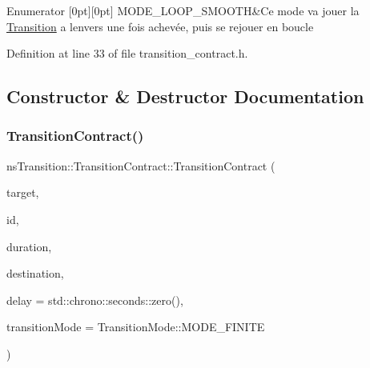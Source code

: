 \begin{DoxyEnumFields}{Enumerator}
[0pt][0pt]{}\mbox{\label{classns_transition_1_1_transition_contract_a40118ebf3c1a0a486934ce2b9ddc3edba5aa6e1fbf9670aa9ecd96beff2ba6abb}} 
M\+O\+D\+E\+\_\+\+L\+O\+O\+P\+\_\+\+S\+M\+O\+O\+TH&Ce mode va jouer la \hyperlink{classns_transition_1_1_transition}{Transition} a l\textquotesingle{}envers une fois achevée, puis se rejouer en boucle \\
\hline

\end{DoxyEnumFields}


Definition at line 33 of file transition\+\_\+contract.\+h.



\subsection{Constructor \& Destructor Documentation}
\mbox{\label{classns_transition_1_1_transition_contract_a8ec4ef83c08901c9b93cec5eb0bfd06b}} 
\subsubsection{\texorpdfstring{Transition\+Contract()}{TransitionContract()}}
{\footnotesize\ttfamily ns\+Transition\+::\+Transition\+Contract\+::\+Transition\+Contract (\begin{DoxyParamCaption}\item[{\hyperlink{classns_transition_1_1_i_transitionable}{I\+Transitionable} \&}]{target,  }\item[{const int \&}]{id,  }\item[{const \hyperlink{namespacens_transition_a260258f249f46ff9a62da721537f87af}{System\+Duration\+\_\+t} \&}]{duration,  }\item[{const std\+::vector$<$ float $>$ \&}]{destination,  }\item[{const \hyperlink{namespacens_transition_a260258f249f46ff9a62da721537f87af}{System\+Duration\+\_\+t} \&}]{delay = {\ttfamily std\+:\+:chrono\+:\+:seconds\+:\+:zero()},  }\item[{const \hyperlink{classns_transition_1_1_transition_contract_a40118ebf3c1a0a486934ce2b9ddc3edb}{Transition\+Mode} \&}]{transition\+Mode = {\ttfamily TransitionMode\+:\+:MODE\+\_\+FINITE} }\end{DoxyParamCaption})}



